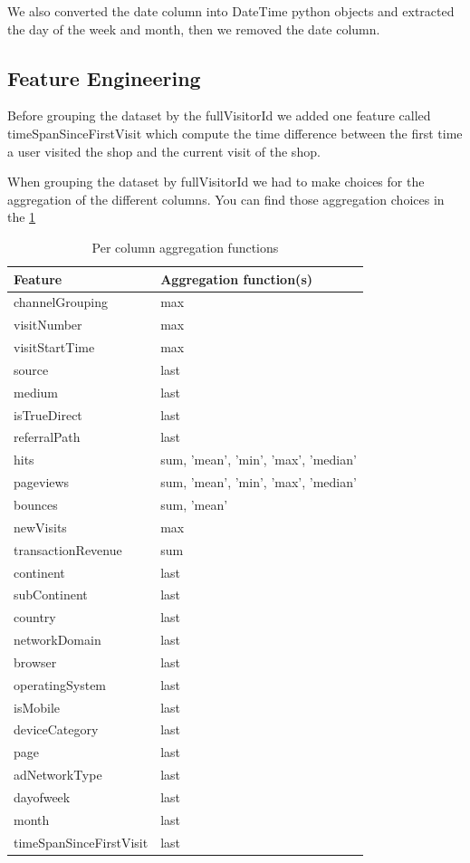\documentclass[a4paper, 12pt, one column]{article}
\begin{document}
We also converted the date column into DateTime python objects and extracted the day of the week and month, then we removed the date column.

\subsection{Feature Engineering}

Before grouping the dataset by the fullVisitorId we added one feature called timeSpanSinceFirstVisit which compute the time difference between the first time a user
visited the shop and the current visit of the shop.

When grouping the dataset by fullVisitorId we had to make choices for the aggregation of the different columns. You can find those aggregation choices in the \cref{tab:agg_functions}

\begin{table}[H]
\centering
\begin{tabular}{|l|l|}
    \hline
    \textbf{Feature} & \textbf{Aggregation function(s)}\\ \hline
    channelGrouping & max \\ \hline
    visitNumber & max \\ \hline
    visitStartTime & max \\ \hline
    source & last \\ \hline
    medium & last \\ \hline
    isTrueDirect & last \\ \hline
    referralPath & last \\ \hline
    hits & sum, 'mean', 'min', 'max', 'median' \\ \hline
    pageviews & sum, 'mean', 'min', 'max', 'median' \\ \hline
    bounces & sum, 'mean' \\ \hline
    newVisits & max \\ \hline
    transactionRevenue & sum \\ \hline
    continent & last \\ \hline
    subContinent & last \\ \hline
    country & last \\ \hline
    networkDomain & last \\ \hline
    browser & last \\ \hline
    operatingSystem & last \\ \hline
    isMobile & last \\ \hline
    deviceCategory & last \\ \hline
    page & last \\ \hline
    adNetworkType & last \\ \hline
    dayofweek & last \\ \hline
    month & last \\ \hline
    timeSpanSinceFirstVisit & last \\ \hline
\end{tabular}
\caption{Per column aggregation functions}
\label{tab:agg_functions}
\end{table}
\end{document}
